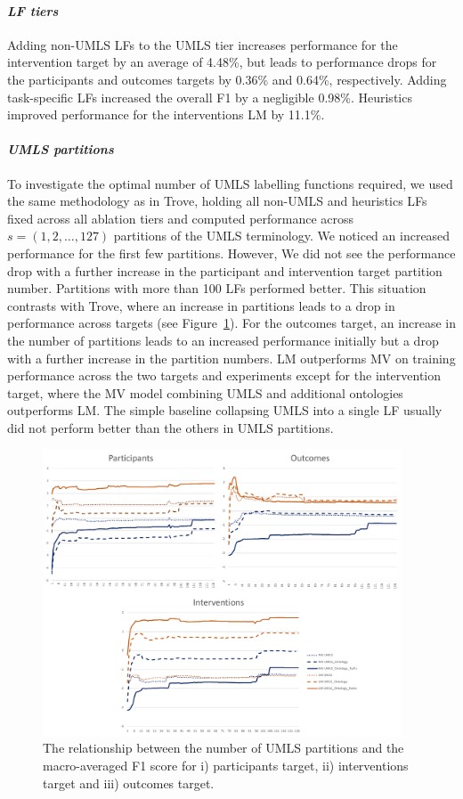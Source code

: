 \documentclass[10.7pt,]{article}
\let\oldparagraph\paragraph
\renewcommand{\paragraph}[1]{\oldparagraph{#1}\mbox{}}
\begin{document}
\paragraph{\textit{LF tiers}}
Adding non-UMLS LFs to the UMLS tier increases performance for the intervention target by an average of 4.48\%, but leads to performance drops for the participants and outcomes targets by 0.36\% and 0.64\%, respectively.
Adding task-specific LFs increased the overall F1 by a negligible 0.98\%.
Heuristics improved performance for the interventions LM by 11.1\%.
%
\paragraph{\textit{UMLS partitions}}
To investigate the optimal number of UMLS labelling functions required, we used the same methodology as in Trove, holding all non-UMLS and heuristics LFs fixed across all ablation tiers and computed performance across $s = ( 1, 2, \dotso , 127 )$ partitions of the UMLS terminology.
We noticed an increased performance for the first few partitions. However, We did not see the performance drop with a further increase in the participant and intervention target partition number.
Partitions with more than 100 LFs performed better.
This situation contrasts with Trove, where an increase in partitions leads to a drop in performance across targets (see Figure~\ref{fig:partitions}).
For the outcomes target, an increase in the number of partitions leads to an increased performance initially but a drop with a further increase in the partition numbers.
LM outperforms MV on training performance across the two targets and experiments except for the intervention target, where the MV model combining UMLS and additional ontologies outperforms LM.
The simple baseline collapsing UMLS into a single LF usually did not perform better than the others in UMLS partitions. 
%
\begin{figure}[!h]
    \centering
    \includegraphics[width=0.95\textwidth]{figures/partitions.pdf}
    \caption{The relationship between the number of UMLS partitions and the macro-averaged F1 score for i) participants target, ii) interventions target and iii) outcomes target.}
    \label{fig:partitions}
\end{figure}
%
%
%
\end{document}
